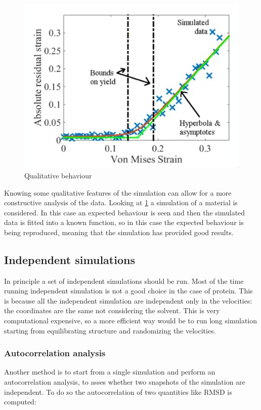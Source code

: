 	\begin{figure}[H]
		\includegraphics[width = \textwidth]{qualitative-behaviour}
		\caption{Qualitative behaviour}
		\label{fig:qualitative-behaviour}
	\end{figure}

	Knowing some qualitative features of the simulation can allow for a more constructive analysis of the data.
	Looking at \ref{fig:qualitative-behaviour} a simulation of a material is considered.
	In this case an expected behaviour is seen and then the simulated data is fitted into a known function, so in this case the expected behaviour is being reproduced, meaning that the simulation has provided good results.

	\subsection{Independent simulations}
	In principle a set of independent simulations should be run.
	Most of the time running independent simulation is not a good choice in the case of protein.
	This is because all the independent simulation are independent only in the velocities: the coordinates are the same not considering the solvent.
	This is very computational expensive, so a more efficient way would be to run long simulation starting from equilibrating structure and randomizing the velocities.

		\subsubsection{Autocorrelation analysis}
		Another method is to start from a single simulation and perform an autocorrelation analysis, to asses whether two snapshots of the simulation are independent.
		To do so the autocorrelation of two quantities like RMSD is computed:

